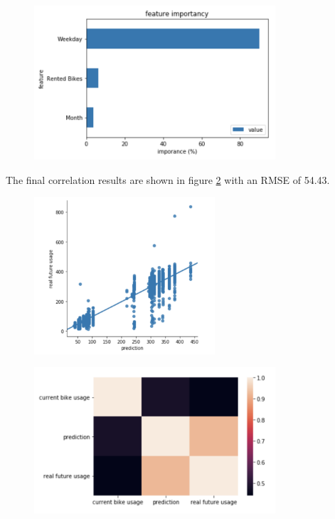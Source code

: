 \begin{figure}[H]
\centering
\includegraphics[width=0.8\textwidth]{media/test7_dt}\label{fig:test7_dt}
\label{fig:test7_dt}
\end{figure}
The final correlation results are shown in figure \ref{fig:image25} with an RMSE of 54.43.
\begin{figure}[H]
\centering
\includegraphics[width=0.6\textwidth]{media/image25}\label{fig:image25}
\label{fig:image25}
\end{figure}
\begin{figure}[H]
\centering
\includegraphics[width=0.8\textwidth]{media/image26}\label{fig:image26}
\label{fig:image26}
\end{figure}
